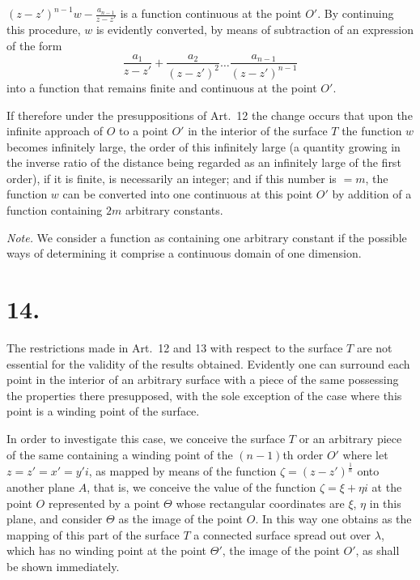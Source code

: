 \documentclass{article}
\begin{document}
$(z - z')^{n-1}w - \frac{a_{n-1}}{z - z'}$ is a function continuous at the point $O'$. By continuing this procedure, $w$ is evidently converted, by means of subtraction of an expression of the form
\[
\frac{a_1}{z - z'} + \frac{a_2}{(z - z')^2} \dots \frac{a_{n-1}}{(z - z')^{n-1}}
\]
into a function that remains finite and continuous at the point $O'$.

If therefore under the presuppositions of Art.~12 the change occurs that upon the infinite approach of $O$ to a point $O'$ in the interior of the surface $T$ the function $w$ becomes infinitely large, the order of this infinitely large (a quantity growing in the inverse ratio of the distance being regarded as an infinitely large of the first order), if it is finite, is necessarily an integer; and if this number is $= m$, the function $w$ can be converted into one continuous at this point $O'$ by addition of a function containing $2m$ arbitrary constants.

\emph{Note.} We consider a function as containing one arbitrary constant if the possible ways of determining it comprise a continuous domain of one dimension.

\section*{14.}

The restrictions made in Art.~12 and 13 with respect to the surface $T$ are not essential for the validity of the results obtained. Evidently one can surround each point in the interior of an arbitrary surface with a piece of the same possessing the properties there presupposed, with the sole exception of the case where this point is a winding point of the surface.

In order to investigate this case, we conceive the surface $T$ or an arbitrary piece of the same containing a winding point of the $(n-1)$th order $O'$ where let $z = z' = x' = y'i$, as mapped by means of the function $\zeta = (z - z')^{\frac{1}{n}}$ onto another plane $A$, that is, we conceive the value of the function $\zeta = \xi + \eta i$ at the point $O$ represented by a point $\varTheta$ whose rectangular coordinates are $\xi$, $\eta$ in this plane, and consider $\varTheta$ as the image of the point $O$. In this way one obtains as the mapping of this part of the surface $T$ a connected surface spread out over $\lambda$, which has no winding point at the point $\varTheta'$, the image of the point $O'$, as shall be shown immediately.
\end{document}
